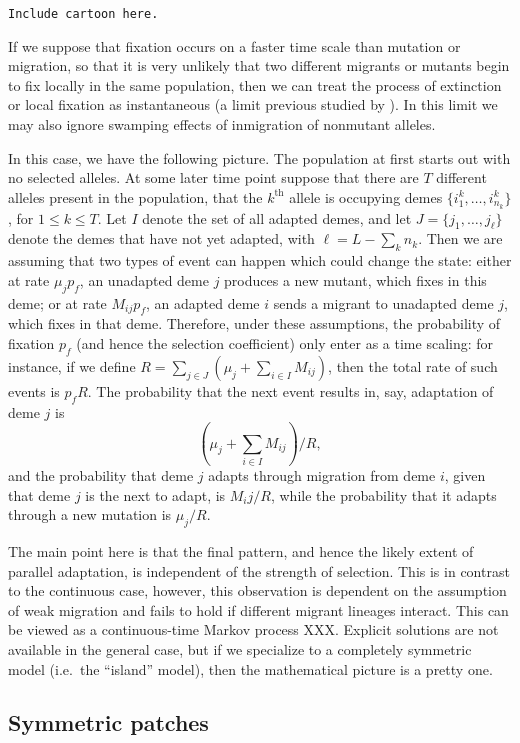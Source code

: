 \documentclass{article}
\begin{document}
{\tt Include cartoon here.}

If we suppose that fixation occurs on a faster time scale than mutation or migration,
so that it is very unlikely that two different migrants or mutants begin to fix locally in the same population,
then we can treat the process of extinction or local fixation as instantaneous 
(a limit previous studied by \cite{Slatkin:81}).
In this limit we may also ignore swamping effects of inmigration of nonmutant alleles.

In this case, we have the following picture.
The population at first starts out with no selected alleles. 
At some later time point suppose that there are $T$ different alleles present in the population, 
that the $k^\mathrm{th}$ allele is occupying demes $\{i^k_1, \ldots, i^k_{n_k}\}$, for $1\le k \le T$.
Let $I$ denote the set of all adapted demes, 
and let $J = \{j_1, \ldots, j_\ell\}$ denote the demes that have not yet adapted, with $\ell = L - \sum_k n_k$.
Then we are assuming that two types of event can happen which could change the state:
either at rate $\mu_j p_f$, an unadapted deme $j$ produces a new mutant, which fixes in this deme;
or at rate $M_{ij} p_f$, an adapted deme $i$ sends a migrant to unadapted deme $j$, which fixes in that deme.
Therefore, under these assumptions, the probability of fixation $p_f$ (and hence the selection coefficient)
only enter as a time scaling: for instance,
if we define $R = \sum_{j \in J} \left( \mu_j + \sum_{i \in I} M_{ij} \right)$,
then the total rate of such events is $p_f R$.
The probability that the next event results in, say, adaptation of deme $j$
is 
\[
 \left( \mu_j + \sum_{i \in I} M_{ij} \right) / R,
\]
and the probability that deme $j$ adapts through migration from deme $i$, given that deme $j$ is the next to adapt, is
$M_ij / R$,
while the probability that it adapts through a new mutation is $\mu_j / R$.

The main point here is that the final pattern,
and hence the likely extent of parallel adaptation,
is independent of the strength of selection.
This is in contrast to the continuous case, however, this observation is dependent on the assumption of weak migration
and fails to hold if different migrant lineages interact.
This can be viewed as a continuous-time Markov process XXX.
Explicit solutions are not available in the general case,
but if we specialize to a completely symmetric model (i.e.\ the ``island'' model),
then the mathematical picture is a pretty one.

\subsection{Symmetric patches}
\end{document}
